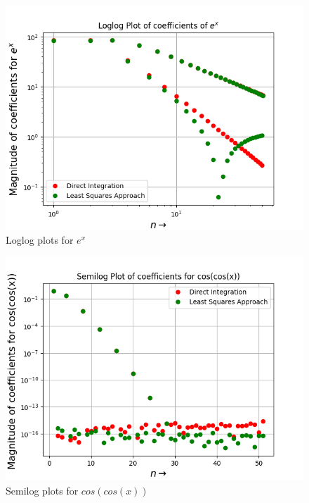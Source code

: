 \documentclass[11pt, a4paper]{article}
\begin{document}
   \begin{figure}[!tbh]
   	\centering
   	\includegraphics[scale=0.6]{Ass4_Figure_8.png}   
   	\caption{Loglog plots for $e^{x}$}
   	\label{fig:sample}
   \end{figure} 
   \begin{figure}[!tbh]
   	\centering
   	\includegraphics[scale=0.6]{Ass4_Figure_9.png}   
   	\caption{Semilog plots for $cos(cos(x))$}
   	\label{fig:sample}
   \end{figure} 
   
\end{document}
